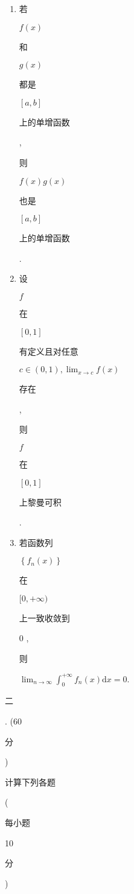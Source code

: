 \documentclass[10pt]{article}
\begin{document}
\begin{enumerate}
  \item \begin{CJK}{UTF8}{mj}若\end{CJK} $f(x)$ \begin{CJK}{UTF8}{mj}和\end{CJK} $g(x)$ \begin{CJK}{UTF8}{mj}都是\end{CJK} $[a, b]$ \begin{CJK}{UTF8}{mj}上的单增函数\end{CJK}, \begin{CJK}{UTF8}{mj}则\end{CJK} $f(x) g(x)$ \begin{CJK}{UTF8}{mj}也是\end{CJK} $[a, b]$ \begin{CJK}{UTF8}{mj}上的单增函数\end{CJK}.

  \item \begin{CJK}{UTF8}{mj}设\end{CJK} $f$ \begin{CJK}{UTF8}{mj}在\end{CJK} $[0,1]$ \begin{CJK}{UTF8}{mj}有定义且对任意\end{CJK} $c \in(0,1), \lim _{x \rightarrow c} f(x)$ \begin{CJK}{UTF8}{mj}存在\end{CJK}, \begin{CJK}{UTF8}{mj}则\end{CJK} $f$ \begin{CJK}{UTF8}{mj}在\end{CJK} $[0,1]$ \begin{CJK}{UTF8}{mj}上黎曼可积\end{CJK}.

  \item \begin{CJK}{UTF8}{mj}若函数列\end{CJK} $\left\{f_{n}(x)\right\}$ \begin{CJK}{UTF8}{mj}在\end{CJK} $[0,+\infty)$ \begin{CJK}{UTF8}{mj}上一致收敛到\end{CJK} 0 , \begin{CJK}{UTF8}{mj}则\end{CJK} $\lim _{n \rightarrow \infty} \int_{0}^{+\infty} f_{n}(x) \mathrm{d} x=0$.

\end{enumerate}
\begin{CJK}{UTF8}{mj}二\end{CJK}. (60 \begin{CJK}{UTF8}{mj}分\end{CJK}) \begin{CJK}{UTF8}{mj}计算下列各题\end{CJK} (\begin{CJK}{UTF8}{mj}每小题\end{CJK} 10 \begin{CJK}{UTF8}{mj}分\end{CJK})
\end{document}
